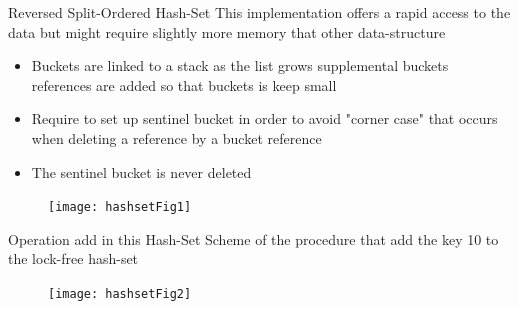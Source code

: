 \documentclass{bredelebeamer}
\begin{document}
     \begin{frame}{Reversed Split-Ordered Hash-Set}
        This implementation offers a rapid access to the data but might require slightly more memory that other data-structure
        \begin{itemize}
            \item Buckets are linked to a stack as the list grows supplemental buckets references are added so that buckets is keep small
            \item Require to set up sentinel bucket in order to avoid "corner case" that occurs when deleting a reference by a bucket reference
            \item The sentinel bucket is never deleted
        \end{itemize}
         \begin{figure}
             \centering
             \texttt{[image: hashsetFig1]}
         \end{figure}
    \end{frame}

     \begin{frame}{Operation add in this Hash-Set}
         Scheme of the procedure that add the key 10 to the lock-free hash-set
         \begin{figure}
             \centering
             \texttt{[image: hashsetFig2]}
         \end{figure}
    \end{frame}

\end{document}
